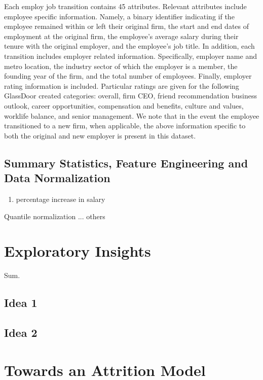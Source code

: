 \documentclass[10pt]{article}
\begin{document}
Each employ job transition contains 45 attributes.  Relevant attributes 
include employee specific information. Namely, a binary identifier 
indicating if the employee remained within or left their original firm,
the start and end dates of employment at the original firm, the 
employee's average salary during their tenure with the original employer, 
and the employee's job title. 
In addition, each transition includes employer related information. 
Specifically, employer name and metro location, the industry sector of which the employer 
is a member, the founding year of the firm, and the total number of employees. 
Finally, employer rating information is included.  Particular ratings are 
given for the following GlassDoor created categories: overall, firm CEO, friend recommendation 
business outlook, career opportunities, compensation and benefits, culture and values, 
worklife balance, and senior management. 
We note that in the event the employee transitioned to a new firm, when applicable,
the above information specific to both the original and new employer is present in this dataset. 

\subsection{Summary Statistics, Feature Engineering and Data Normalization}

\begin{enumerate}
    \item percentage increase in salary 
\end{enumerate}

Quantile normalization ... others 

\section{Exploratory Insights}

Sum. 

\subsection{Idea 1}


\subsection{Idea 2}

\section{Towards an Attrition Model}
\end{document}
